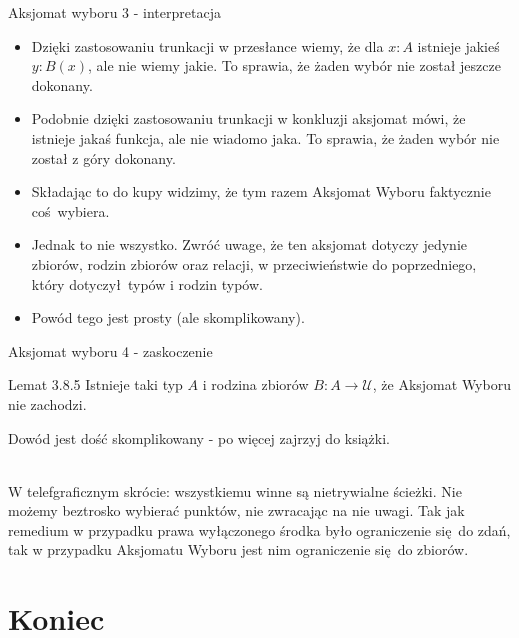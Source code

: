 \documentclass{beamer}
\newcommand{\U}{\mathcal{U}}
\begin{document}
\begin{frame}{Aksjomat wyboru 3 - interpretacja}
\begin{itemize}
	\item Dzięki zastosowaniu trunkacji w przesłance wiemy, że dla $x : A$ istnieje jakieś $y : B(x)$, ale nie wiemy jakie. To sprawia, że żaden wybór nie został jeszcze dokonany.
	\item Podobnie dzięki zastosowaniu trunkacji w konkluzji aksjomat mówi, że istnieje jakaś funkcja, ale nie wiadomo jaka. To sprawia, że żaden wybór nie został z góry dokonany.
	\item Składając to do kupy widzimy, że tym razem Aksjomat Wyboru faktycznie coś wybiera.
	\item Jednak to nie wszystko. Zwróć uwage, że ten aksjomat dotyczy jedynie zbiorów, rodzin zbiorów oraz relacji, w przeciwieństwie do poprzedniego, który dotyczył typów i rodzin typów.
	\item Powód tego jest prosty (ale skomplikowany).
\end{itemize}
\end{frame}

\begin{frame}{Aksjomat wyboru 4 - zaskoczenie}

\begin{block}{Lemat 3.8.5}
Istnieje taki typ $A$ i rodzina zbiorów $B : A \to \U$, że Aksjomat Wyboru nie zachodzi.
\end{block}

Dowód jest dość skomplikowany - po więcej zajrzyj do książki. \\~\

W telefgraficznym skrócie: wszystkiemu winne są nietrywialne ścieżki. Nie możemy beztrosko wybierać punktów, nie zwracając na nie uwagi. Tak jak remedium w przypadku prawa wyłączonego środka było ograniczenie się do zdań, tak w przypadku Aksjomatu Wyboru jest nim ograniczenie się do zbiorów.

\end{frame}

\section{Koniec}
\end{document}
